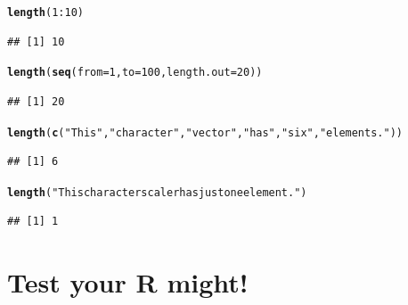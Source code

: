 \documentclass{tufte-book}\usepackage[]{graphicx}\usepackage[]{color}
\makeatletter
\newcommand{\hlnum}[1]{\textcolor[rgb]{0.686,0.059,0.569}{#1}}%
\newcommand{\hlstr}[1]{\textcolor[rgb]{0.192,0.494,0.8}{#1}}%
\newcommand{\hlopt}[1]{\textcolor[rgb]{0,0,0}{#1}}%
\newcommand{\hlstd}[1]{\textcolor[rgb]{0.345,0.345,0.345}{#1}}%
\newcommand{\hlkwc}[1]{\textcolor[rgb]{0.333,0.667,0.333}{#1}}%
\newcommand{\hlkwd}[1]{\textcolor[rgb]{0.737,0.353,0.396}{\textbf{#1}}}%
\newenvironment{kframe}{%
 \def\at@end@of@kframe{}%
 \ifinner\ifhmode%
  \def\at@end@of@kframe{\end{minipage}}%
  \begin{minipage}{\columnwidth}%
 \fi\fi%
 \def\FrameCommand##1{\hskip\@totalleftmargin \hskip-\fboxsep
 \colorbox{shadecolor}{##1}\hskip-\fboxsep
     \hskip-\linewidth \hskip-\@totalleftmargin \hskip\columnwidth}%
 \MakeFramed {\advance\hsize-\width
   \@totalleftmargin\z@ \linewidth\hsize
   \@setminipage}}%
 {\par\unskip\endMakeFramed%
 \at@end@of@kframe}
\newenvironment{knitrout}{}{} %
\makeatother
\begin{document}
\begin{knitrout}
\color{fgcolor}\begin{kframe}
\begin{alltt}
\hlkwd{length}\hlstd{(}\hlnum{1}\hlopt{:}\hlnum{10}\hlstd{)}
\end{alltt}
\begin{verbatim}
## [1] 10
\end{verbatim}
\begin{alltt}
\hlkwd{length}\hlstd{(}\hlkwd{seq}\hlstd{(}\hlkwc{from} \hlstd{=} \hlnum{1}\hlstd{,} \hlkwc{to} \hlstd{=} \hlnum{100}\hlstd{,} \hlkwc{length.out} \hlstd{=} \hlnum{20}\hlstd{))}
\end{alltt}
\begin{verbatim}
## [1] 20
\end{verbatim}
\begin{alltt}
\hlkwd{length}\hlstd{(}\hlkwd{c}\hlstd{(}\hlstr{"This"}\hlstd{,} \hlstr{"character"}\hlstd{,} \hlstr{"vector"}\hlstd{,} \hlstr{"has"}\hlstd{,} \hlstr{"six"}\hlstd{,} \hlstr{"elements."}\hlstd{))}
\end{alltt}
\begin{verbatim}
## [1] 6
\end{verbatim}
\begin{alltt}
\hlkwd{length}\hlstd{(}\hlstr{"This character scaler has just one element."}\hlstd{)}
\end{alltt}
\begin{verbatim}
## [1] 1
\end{verbatim}
\end{kframe}
\end{knitrout}



\section{Test your R might!}
\end{document}
